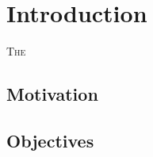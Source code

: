 \chapter{Introduction}
\label{ch:Introduction}
\lettrine[lraise=-0.1, lines=2, loversize=0.2]{T}{he}




\section{Motivation}
\label{sec:Motivation}

\section{Objectives}
\label{sec:Objectives}




\endinput
